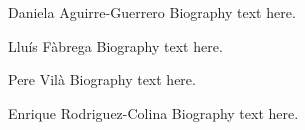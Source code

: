\documentclass[journal]{IEEEtran}
\begin{document}
\begin{IEEEbiography}{Daniela Aguirre-Guerrero}
Biography text here.
\end{IEEEbiography}

\begin{IEEEbiographynophoto}{Llu\'is F\`abrega}
Biography text here.
\end{IEEEbiographynophoto}


\begin{IEEEbiographynophoto}{Pere Vil\`a}
Biography text here.
\end{IEEEbiographynophoto}

\begin{IEEEbiographynophoto}{Enrique Rodriguez-Colina}
Biography text here.
\end{IEEEbiographynophoto}






\end{document}
